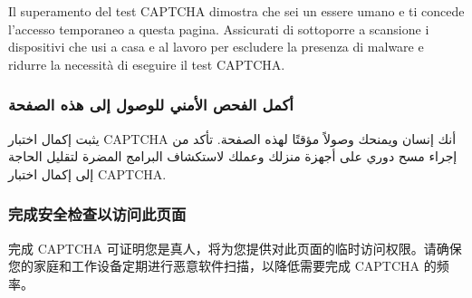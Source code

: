 Il superamento del test CAPTCHA dimostra che sei un essere umano e ti
concede l'accesso temporaneo a questa pagina. Assicurati di sottoporre a
scansione i dispositivi che usi a casa e al lavoro per escludere la
presenza di malware e ridurre la necessità di eseguire il test CAPTCHA.

\hypertarget{ux623ux643ux645ux644-ux627ux644ux641ux62dux635-ux627ux644ux623ux645ux646ux64a-ux644ux644ux648ux635ux648ux644-ux625ux644ux649-ux647ux630ux647-ux627ux644ux635ux641ux62dux629}{%
\subsubsection{أكمل الفحص الأمني للوصول إلى هذه
الصفحة}\label{ux623ux643ux645ux644-ux627ux644ux641ux62dux635-ux627ux644ux623ux645ux646ux64a-ux644ux644ux648ux635ux648ux644-ux625ux644ux649-ux647ux630ux647-ux627ux644ux635ux641ux62dux629}}

يثبت إكمال اختبار CAPTCHA أنك إنسان ويمنحك وصولاً مؤقتًا لهذه الصفحة.
تأكد من إجراء مسح دوري على أجهزة منزلك وعملك لاستكشاف البرامج المضرة
لتقليل الحاجة إلى إكمال اختبار CAPTCHA.

\hypertarget{ux5b8cux6210ux5b89ux5168ux68c0ux67e5ux4ee5ux8bbfux95eeux6b64ux9875ux9762}{%
\subsubsection{完成安全检查以访问此页面}\label{ux5b8cux6210ux5b89ux5168ux68c0ux67e5ux4ee5ux8bbfux95eeux6b64ux9875ux9762}}

完成 CAPTCHA
可证明您是真人，将为您提供对此页面的临时访问权限。请确保您的家庭和工作设备定期进行恶意软件扫描，以降低需要完成
CAPTCHA 的频率。
